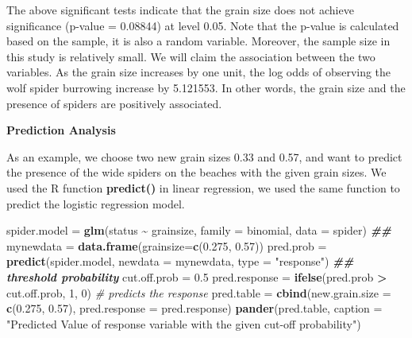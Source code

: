 \documentclass[
]{book}
\newenvironment{Shaded}{\begin{snugshade}}{\end{snugshade}}
\newcommand{\AttributeTok}[1]{\textcolor[rgb]{0.13,0.29,0.53}{#1}}
\newcommand{\CommentTok}[1]{\textcolor[rgb]{0.56,0.35,0.01}{\textit{#1}}}
\newcommand{\DecValTok}[1]{\textcolor[rgb]{0.00,0.00,0.81}{#1}}
\newcommand{\DocumentationTok}[1]{\textcolor[rgb]{0.56,0.35,0.01}{\textbf{\textit{#1}}}}
\newcommand{\FloatTok}[1]{\textcolor[rgb]{0.00,0.00,0.81}{#1}}
\newcommand{\FunctionTok}[1]{\textcolor[rgb]{0.13,0.29,0.53}{\textbf{#1}}}
\newcommand{\NormalTok}[1]{#1}
\newcommand{\OtherTok}[1]{\textcolor[rgb]{0.56,0.35,0.01}{#1}}
\newcommand{\SpecialCharTok}[1]{\textcolor[rgb]{0.81,0.36,0.00}{\textbf{#1}}}
\newcommand{\StringTok}[1]{\textcolor[rgb]{0.31,0.60,0.02}{#1}}
\begin{document}
The above significant tests indicate that the grain size does not achieve significance (p-value = 0.08844) at level 0.05. Note that the p-value is calculated based on the sample, it is also a random variable. Moreover, the sample size in this study is relatively small. We will claim the association between the two variables. As the grain size increases by one unit, the log odds of observing the wolf spider burrowing increase by 5.121553. In other words, the grain size and the presence of spiders are positively associated.

\textbf{Prediction Analysis}

As an example, we choose two new grain sizes 0.33 and 0.57, and want to predict the presence of the wide spiders on the beaches with the given grain sizes. We used the R function \textbf{predict()} in linear regression, we used the same function to predict the logistic regression model.

\begin{Shaded}
\begin{Highlighting}[]
\NormalTok{spider.model }\OtherTok{=} \FunctionTok{glm}\NormalTok{(status }\SpecialCharTok{\textasciitilde{}}\NormalTok{ grainsize, }
                   \AttributeTok{family =}\NormalTok{ binomial,}
                   \AttributeTok{data =}\NormalTok{ spider)}
\DocumentationTok{\#\# }
\NormalTok{mynewdata }\OtherTok{=} \FunctionTok{data.frame}\NormalTok{(}\AttributeTok{grainsize=}\FunctionTok{c}\NormalTok{(}\FloatTok{0.275}\NormalTok{, }\FloatTok{0.57}\NormalTok{))}
\NormalTok{pred.prob }\OtherTok{=} \FunctionTok{predict}\NormalTok{(spider.model, }\AttributeTok{newdata =}\NormalTok{ mynewdata, }
        \AttributeTok{type =} \StringTok{"response"}\NormalTok{)}
\DocumentationTok{\#\# threshold probability}
\NormalTok{cut.off.prob }\OtherTok{=} \FloatTok{0.5}
\NormalTok{pred.response }\OtherTok{=} \FunctionTok{ifelse}\NormalTok{(pred.prob }\SpecialCharTok{\textgreater{}}\NormalTok{ cut.off.prob, }\DecValTok{1}\NormalTok{, }\DecValTok{0}\NormalTok{)  }\CommentTok{\# predicts the response}
\NormalTok{pred.table }\OtherTok{=} \FunctionTok{cbind}\NormalTok{(}\AttributeTok{new.grain.size =} \FunctionTok{c}\NormalTok{(}\FloatTok{0.275}\NormalTok{, }\FloatTok{0.57}\NormalTok{),}
                   \AttributeTok{pred.response =}\NormalTok{ pred.response)}
\FunctionTok{pander}\NormalTok{(pred.table, }\AttributeTok{caption =} \StringTok{"Predicted Value of response variable }
\StringTok{      with the given cut{-}off probability"}\NormalTok{)}
\end{Highlighting}
\end{Shaded}
\end{document}
